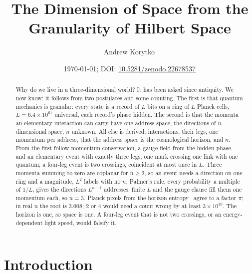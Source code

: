 \documentclass[aps,prd,twocolumn,superscriptaddress,nofootinbib]{revtex4-2}
\begin{document}
\title{The Dimension of Space from the Granularity of Hilbert Space}

\author{Andrew Korytko\,}

\date{\today; DOI: \href{https://doi.org/10.5281/zenodo.22678537}{10.5281/zenodo.22678537}}

\begin{abstract}
Why do we live in a three-dimensional world? It has been asked since antiquity. We now know: it follows from two postulates and some counting. The first is that quantum mechanics is granular: every state is a record of $L$ bits on a ring of $L$ Planck cells, $L = 6.4\times10^{61}$ universal, each record's phase hidden. The second is that the momenta an elementary interaction can carry have one address space, the directions of $n$-dimensional space, $n$ unknown. All else is derived: interactions, their legs, one momentum per address, that the address space is the cosmological horizon, and $n$. From the first follow momentum conservation, a gauge field from the hidden phase, and an elementary event with exactly three legs, one mark crossing one link with one quantum; a four-leg event is two crossings, coincident at most once in $L$. Three momenta summing to zero are coplanar for $n \ge 2$, so an event needs a direction on one ring and a magnitude, $L^2$ labels with no $n$; Palmer's rule, every probability a multiple of $1/L$, gives the directions $L^{n-1}$ addresses; finite $L$ and the gauge clause fill them one momentum each, so $n = 3$. Planck pixels from the horizon entropy~\cite{korytko2026} agree to a factor $\pi$; in real $n$ the root is $3.008$; 2 or 4 would need a count wrong by at least $3\times10^{30}$. The horizon is one, so space is one. A four-leg event that is not two crossings, or an energy-dependent light speed, would falsify it.
\end{abstract}


\maketitle

\section{Introduction}
\label{sec:intro}
\end{document}
